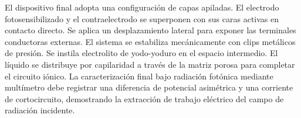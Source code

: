 \documentclass[11pt, a4paper]{article}
\begin{document}
El dispositivo final adopta una configuración de capas apiladas. El electrodo
fotosensibilizado y el contraelectrodo se superponen con sus caras activas en
contacto directo. Se aplica un desplazamiento lateral para exponer las
terminales conductoras externas. El sistema se estabiliza mecánicamente con
clips metálicos de presión. Se instila electrolito de yodo-yoduro en el
espacio intermedio. El líquido se distribuye por capilaridad a través de la
matriz porosa para completar el circuito iónico. La caracterización final bajo
radiación fotónica mediante multímetro debe registrar una diferencia de
potencial asimétrica y una corriente de cortocircuito, demostrando la
extracción de trabajo eléctrico del campo de radiación incidente.

\printbibliography
\nocite{*}
\end{document}
